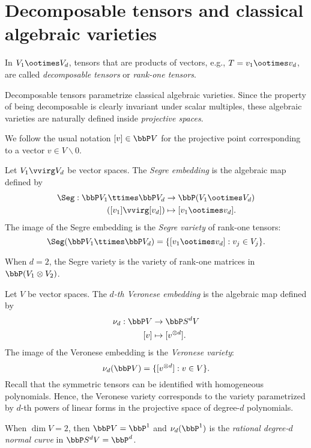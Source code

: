 \section{Decomposable tensors and classical algebraic varieties}
\label{introduction-section-decomposable_tensors}
\begin{definition}\label{introduction-definition-decomposable_tensor}
    In $V_1\ootimes V_d$, tensors that are products of vectors, e.g., $T = v_1 \ootimes v_d$, are called \emph{decomposable tensors} or \emph{rank-one tensors}.
\end{definition}
Decomposable tensors parametrize classical algebraic varieties. Since the property of being decomposable is clearly invariant under scalar multiples, these algebraic varieties are naturally defined inside \emph{projective spaces}.

We follow the usual notation $[v] \in \bbP V$ for the projective point corresponding to a vector $v \in V \smallsetminus 0$.

\begin{definition}
\label{introduction-definition-Segre}
Let $V_1 \vvirg V_d$ be vector spaces. The \emph{Segre embedding} is the algebraic map defined by 
\begin{align*}
\Seg: \bbP V_1 \ttimes \bbP V_d &\to \bbP (V_1 \ootimes V_d) \\
([v_1] \vvirg [v_d]) &\mapsto [v_1 \ootimes v_d].
\end{align*}
The image of the Segre embedding is the \emph{Segre variety} of rank-one tensors:
\[
\Seg( \bbP V_1 \ttimes \bbP V_d) =\{ [v_1 \ootimes v_d] : v_j \in V_j\}.
\]
\end{definition}
When $d = 2$, the Segre variety is the variety of rank-one matrices in $\bbP (V_1 \otimes V_2)$.

\begin{definition}
\label{introduction-definition-Veronese}
Let $V$ be vector spaces. The \emph{$d$-th Veronese embedding} is the algebraic map defined by 
\begin{align*}
    \nu_d : \bbP V &\to \bbP S^d V \\
    [v] &\mapsto [v^{\otimes d}].
\end{align*}
The image of the Veronese embedding is the \emph{Veronese variety}:
\[
    \nu_d( \bbP V ) =\{ [v^{\otimes d}] :  v \in V\}.
\]
Recall that the symmetric tensors can be identified with homogeneous polynomials. Hence, the Veronese variety corresponds to the variety parametrized by $d$-th powers of linear forms in the projective space of degree-$d$ polynomials. 

When $\dim V = 2$, then $\bbP V = \bbP^1$ and $\nu_d( \bbP^1)$ is the \emph{rational degree-$d$ normal curve} in $\bbP S^d V = \bbP^d$.
\end{definition}

